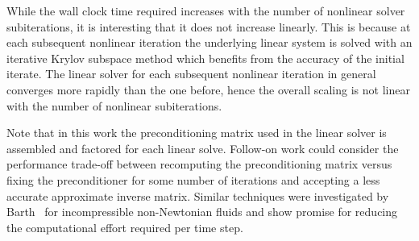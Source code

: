 While the wall clock time required increases with the number of nonlinear solver subiterations, it is interesting that it does not increase linearly.  This is because at each subsequent nonlinear iteration the underlying linear system is solved with an iterative Krylov subspace method which benefits from the accuracy of the initial iterate.  The linear solver for each subsequent nonlinear iteration in general converges more rapidly than the one before, hence the overall scaling is not linear with the number of nonlinear subiterations.

Note that in this work the preconditioning matrix used in the linear solver is assembled and factored for each linear solve.  Follow-on work could consider the performance trade-off between recomputing the preconditioning matrix versus fixing the preconditioner for some number of iterations and accepting a less accurate approximate inverse matrix. Similar techniques were investigated by Barth~\cite{barth_dissertation} for incompressible non-Newtonian fluids and show promise for reducing the computational effort required per time step.

